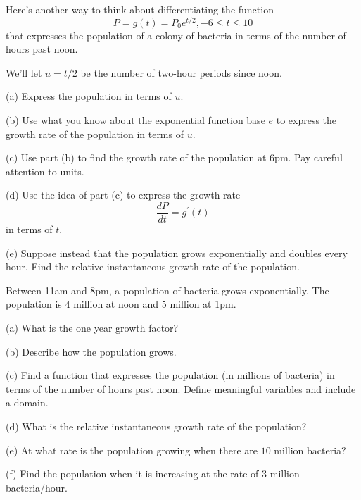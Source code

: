\documentclass{ximera}
\begin{document}
\begin{question} \label{Q34324gbe43}
Here's another way to think about differentiating the function
\[
      P = g(t) = P_0 e^{t/2} , -6 \leq t \leq 10
\]
that expresses the population of a colony of bacteria in terms of the number of hours past noon.

We'll let $u=t/2$ be the number of two-hour periods since noon. 

(a) Express the population in terms of $u$.

(b) Use what you know about the exponential function base $e$ to express the growth rate of the population in terms of $u$.

(c) Use part (b) to find the growth rate of the population at 6pm. Pay careful attention to units.

(d) Use the idea of part (c) to express the growth rate
\[
    \frac{dP}{dt} = g^\prime(t)
\]
in terms of $t$.

(e) Suppose instead that the population grows exponentially and doubles every hour. Find the relative instantaneous growth rate of the population.

\end{question}


\begin{question}  \label{Qe545tgbvb}
Between 11am and 8pm, a population of bacteria grows exponentially. The population is 4 million at noon and 5 million at 1pm.

(a) What is the one year growth factor?

(b) Describe how the population grows.

(c) Find a function that expresses the population (in millions of bacteria) in terms of the number of hours past noon. Define meaningful variables and include a domain.

(d) What is the relative instantaneous growth rate of the population?

(e) At what rate is the population growing when there are $10$ million bacteria?

(f) Find the population when it is increasing at the rate of $3$ million bacteria/hour.

\end{question}
\end{document}
